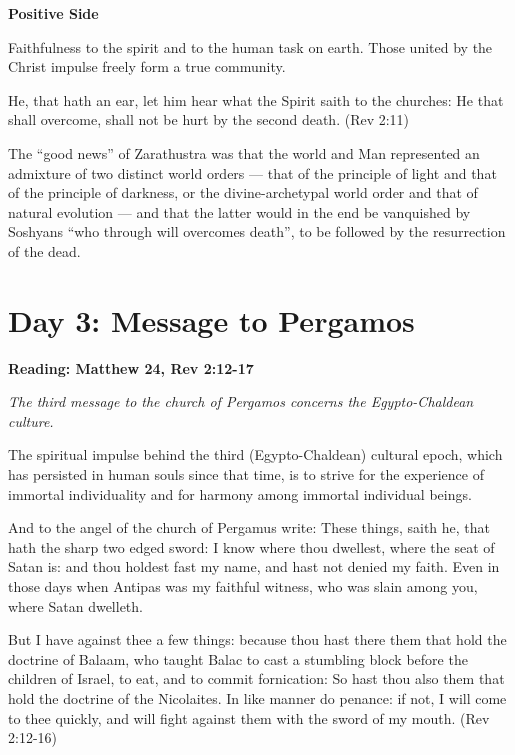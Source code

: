 \textbf{Positive Side}

Faithfulness to the spirit and to the human task on earth. Those united by the Christ impulse freely form a true community.

He, that hath an ear, let him hear what the Spirit saith to the churches: He that shall overcome, shall not be hurt by the second death. (Rev 2:11)

\begin{quotex}
The ``good news'' of Zarathustra was that the world and Man represented an admixture of two distinct world orders — that of the principle of light and that of the principle of darkness, or the divine-archetypal world order and that of natural evolution — and that the latter would in the end be vanquished by Soshyans ``who through will overcomes death'', to be followed by the resurrection of the dead. 

\end{quotex}

\section{Day 3: Message to Pergamos}

\textbf{Reading: Matthew 24, Rev 2:12-17}

\emph{The third message to the church of Pergamos concerns the Egypto-Chaldean culture.}

\begin{quotex}
The spiritual impulse behind the third (Egypto-Chaldean) cultural epoch, which has persisted in human souls since that time, is to strive for the experience of immortal individuality and for harmony among immortal individual beings. 

\end{quotex}
And to the angel of the church of Pergamus write: These things, saith he, that hath the sharp two edged sword: I know where thou dwellest, where the seat of Satan is: and thou holdest fast my name, and hast not denied my faith. Even in those days when Antipas was my faithful witness, who was slain among you, where Satan dwelleth.

But I have against thee a few things: because thou hast there them that hold the doctrine of Balaam, who taught Balac to cast a stumbling block before the children of Israel, to eat, and to commit fornication: So hast thou also them that hold the doctrine of the Nicolaites. In like manner do penance: if not, I will come to thee quickly, and will fight against them with the sword of my mouth. (Rev 2:12-16)

